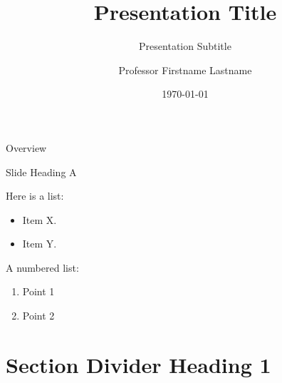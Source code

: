\documentclass[handout]{beamer} 	%
\title{Presentation Title}
\subtitle{Presentation Subtitle} %
\author{Professor Firstname Lastname}
\institute{Faculty, Centre, or Unit}
\date{\today} %
\begin{document}
	

\begin{frame}
	\titlepage
\end{frame}


\begin{frame}{Overview}
	\tableofcontents
\end{frame}


\begin{frame}{Slide Heading A}

Here is a list:
\begin{itemize}
\item Item X.
\item Item Y.
\end{itemize}

\bigskip

A numbered list:
\begin{enumerate}
\item Point 1
\item Point 2
\end{enumerate}

\end{frame}



\section{Section Divider Heading 1}
\begin{frame}
  \sectionpage
\end{frame}
\end{document}
